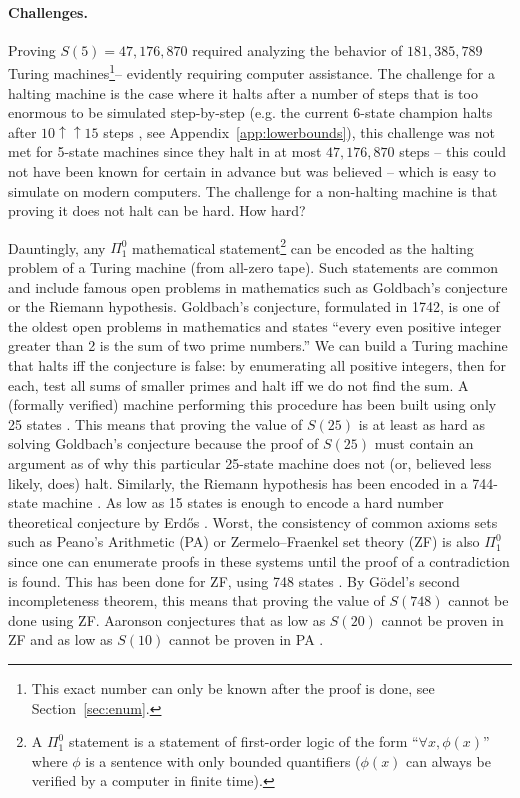 \documentclass[a4paper,british]{article}
\theoremstyle{definition} %
\numberwithin{equation}{section}
\theoremstyle{definition} %
\newcommand{\BBtheFifth}{47{,}176{,}870}
\newcommand{\BBtheFifthTNF}{181{,}385{,}789}
\begin{document}
\paragraph{Challenges.} Proving $S(5) = \BBtheFifth$ required analyzing the behavior of $\BBtheFifthTNF$ Turing machines\footnote{This exact number can only be known after the proof is done, see Section~\ref{sec:enum}.}-- evidently requiring computer assistance. The challenge for a halting machine is the case where it halts after a number of steps that is too enormous to be simulated step-by-step (e.g. the current 6-state champion halts after $10 \uparrow \uparrow 15$ steps \cite{Pavel_discorvery}, see Appendix~\ref{app:lowerbounds}), this challenge was not met for 5-state machines since they halt in at most $\BBtheFifth$ steps -- this could not have been known for certain in advance but was believed -- which is easy to simulate on modern computers. The challenge for a non-halting machine is that proving it does not halt can be hard. How hard?

Dauntingly, any $\Pi_1^0$ mathematical statement\footnote{A $\Pi_1^0$ statement is a statement of first-order logic of the form ``$\forall x, \phi(x)$'' where $\phi$ is a sentence with only bounded quantifiers (\ie $\phi(x)$ can always be verified by a computer in finite time).} can be encoded as the halting problem of a Turing machine (from all-zero tape). Such statements are common and include famous open problems in mathematics such as Goldbach's conjecture or the Riemann hypothesis. Goldbach's conjecture, formulated in 1742, is one of the oldest open problems in mathematics and states ``every even positive integer greater than 2 is the sum of two prime numbers.'' We can build a Turing machine that halts iff the conjecture is false: by enumerating all positive integers, then for each, test all sums of smaller primes and halt iff we do not find the sum. A (formally verified) machine performing this procedure has been built using only 25 states \cite{GoldbachTM27, GoldbachTM25}. This means that proving the value of $S(25)$ is at least as hard as solving Goldbach's conjecture because the proof of $S(25)$ must contain an argument as of why this particular 25-state machine does not (or, believed less likely, does) halt. Similarly, the Riemann hypothesis has been encoded in a 744-state machine \cite{RiemannTM,Yedidia2016,BusyBeaverFrontier}. As low as 15 states is enough to encode a hard number theoretical conjecture by Erd\H{o}s \cite{BB15}. Worst, the consistency of common axioms sets such as Peano's Arithmetic (PA) or Zermelo–Fraenkel set theory (ZF) is also $\Pi_1^0$ since one can enumerate proofs in these systems until the proof of a contradiction is found. This has been done for ZF, using 748 states \cite{ZFTM,Yedidia2016,BusyBeaverFrontier,BB748Thesis}. By G\"odel's second incompleteness theorem, this means that proving the value of $S(748)$ cannot be done using ZF. Aaronson conjectures that as low as $S(20)$ cannot be proven in ZF and as low as $S(10)$ cannot be proven in PA \cite{BusyBeaverFrontier}.
\end{document}
